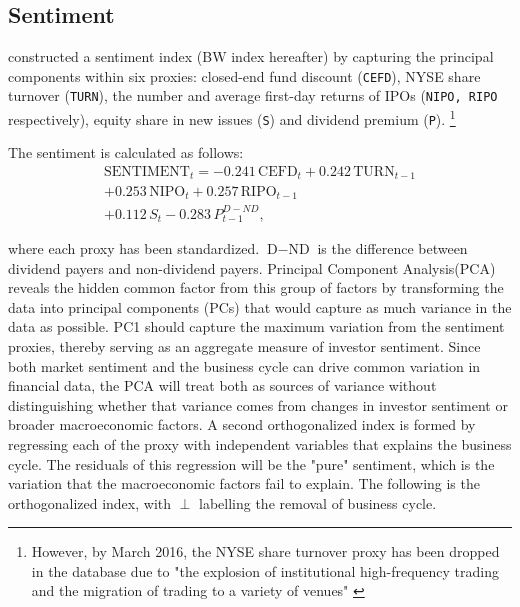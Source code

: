 
\subsection{Sentiment}
 constructed a sentiment index (BW index hereafter) by capturing the principal components within six proxies: closed-end fund discount (\texttt{CEFD}), NYSE share turnover (\texttt{TURN}), the number and average first-day returns of IPOs (\texttt{NIPO, RIPO} respectively), equity share in new issues (\texttt{S}) and dividend premium (\texttt{P}). \footnote{However, by March 2016, the NYSE share turnover proxy has been dropped in the database due to "the explosion of institutional high-frequency trading and the migration of trading to a variety of venues" \cite{ung_2023}}%

The sentiment is calculated as follows:
\begin{equation}
    \label{eq:sentiment}
    \begin{split}
    \text{SENTIMENT}_t = -0.241\,\text{CEFD}_t + 0.242\,\text{TURN}_{t-1} \\ + 0.253\,\text{NIPO}_t 
    + 0.257\,\text{RIPO}_{t-1} \\ + 0.112\,S_t - 0.283\,P^{D-ND}_{t-1} , 
    \end{split}
\end{equation}

where each proxy has been standardized. $\text{D}-\text{ND}$ is the difference between dividend payers and non-dividend payers. Principal Component Analysis(PCA) reveals the hidden common factor from this group of factors by transforming the data into principal components (PCs) that would capture as much variance in the data as possible. PC1 should capture the maximum variation from the sentiment proxies, thereby serving as an aggregate measure of investor sentiment. Since both market sentiment and the business cycle can drive common variation in financial data, the PCA will treat both as sources of variance without distinguishing whether that variance comes from changes in investor sentiment or broader macroeconomic factors. A second orthogonalized index is formed by regressing each of the proxy with independent variables that explains the business cycle. The residuals of this regression will be the "pure" sentiment, which is the variation that the macroeconomic factors fail to explain. The following is the orthogonalized index, with $\perp$ labelling the removal of business cycle. 

